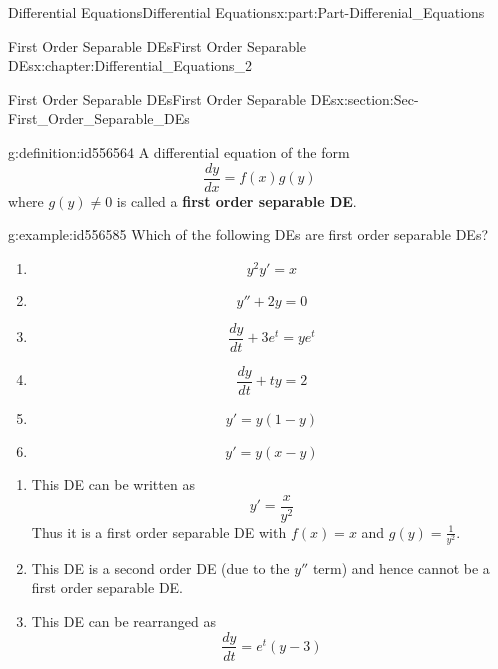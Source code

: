 \documentclass[oneside,10pt,]{book}
\newcommand{\terminology}[1]{\textbf{#1}}
\numberwithin{equation}{section}
\begin{document}
\begin{partptx}{Differential Equations}{}{Differential Equations}{}{}{x:part:Part-Differenial_Equations}
\begin{chapterptx}{First Order Separable DEs}{}{First Order Separable DEs}{}{}{x:chapter:Differential_Equations_2}
\begin{sectionptx}{First Order Separable DEs}{}{First Order Separable DEs}{}{}{x:section:Sec-First_Order_Separable_DEs}
\begin{definition}{}{g:definition:id556564}%
A differential equation of the form%
\begin{equation*}
\frac{dy}{dx}=f(x)g(y)
\end{equation*}
where \(g(y)\neq 0\) is called a \terminology{first order separable DE}.%
\end{definition}
\begin{example}{}{g:example:id556585}%
Which of the following DEs are first order separable DEs?%
\par
%
\begin{enumerate}[label=\alph*.]
\item{}%
\begin{equation*}
y^2y'=x 
\end{equation*}
%
\item{}%
\begin{equation*}
y''+2y=0 
\end{equation*}
%
\item{}%
\begin{equation*}
\frac{dy}{dt}+3e^t=ye^t 
\end{equation*}
%
\item{}%
\begin{equation*}
\frac{dy}{dt}+ty=2 
\end{equation*}
%
\item{}%
\begin{equation*}
y'=y(1-y) 
\end{equation*}
%
\item{}%
\begin{equation*}
y'=y(x-y) 
\end{equation*}
%
\end{enumerate}
%
\par\smallskip%
\noindent\hypertarget{g:solution:id556613}{}%
\begin{enumerate}[label=\alph*.]
\item{}This DE can be written as%
\begin{equation*}
y'=\frac{x}{y^2} 
\end{equation*}
Thus it is a first order separable DE with \(f(x)=x\) and \(g(y)=\frac{1}{y^2}\).%
\item{}This DE is a second order DE (due to the \(y''\) term) and hence cannot be a first order separable DE.%
\item{}This DE can be rearranged as%
\begin{equation*}
\frac{dy}{dt}=e^t(y-3)
\end{equation*}

\end{enumerate}
\end{example}
\end{sectionptx}
\end{chapterptx}
\end{partptx}
\end{document}
